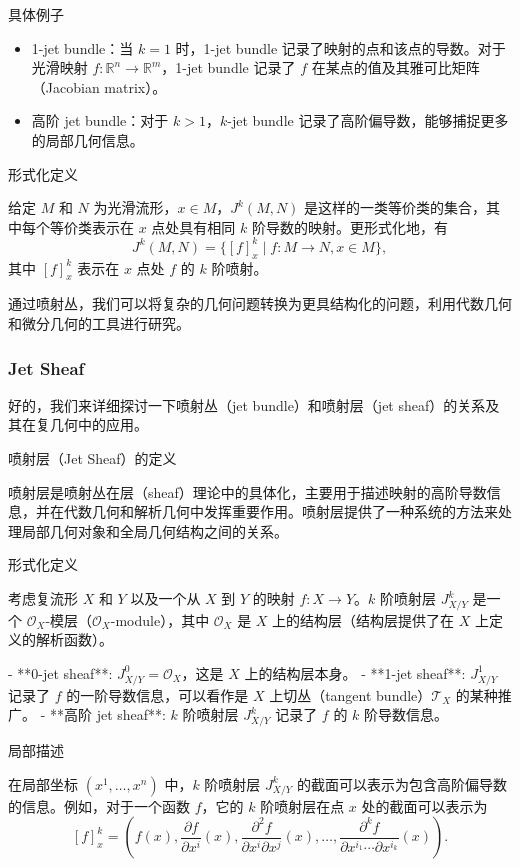 \documentclass[lang=cn,12pt,fontset=none,a4paper]{beautybook}
\begin{document}
具体例子
\begin{itemize}
   \item 1-jet bundle：当 $k=1$ 时，1-jet bundle 记录了映射的点和该点的导数。对于光滑映射 $f: \mathbb{R}^n \to \mathbb{R}^m$，1-jet bundle 记录了 $f$ 在某点的值及其雅可比矩阵（Jacobian matrix）。
   \item 高阶 jet bundle：对于 $k > 1$，$k$-jet bundle 记录了高阶偏导数，能够捕捉更多的局部几何信息。
\end{itemize}
   

形式化定义

给定 $M$ 和 $N$ 为光滑流形，$x \in M$，$J^k(M, N)$ 是这样的一类等价类的集合，其中每个等价类表示在 $x$ 点处具有相同 $k$ 阶导数的映射。更形式化地，有
$$ J^k(M, N) = \{ [f]_x^k \mid f: M \to N, x \in M \}, $$
其中 $[f]_x^k$ 表示在 $x$ 点处 $f$ 的 $k$ 阶喷射。

通过喷射丛，我们可以将复杂的几何问题转换为更具结构化的问题，利用代数几何和微分几何的工具进行研究。

\subsubsection*{Jet Sheaf}
好的，我们来详细探讨一下喷射丛（jet bundle）和喷射层（jet sheaf）的关系及其在复几何中的应用。

喷射层（Jet Sheaf）的定义

喷射层是喷射丛在层（sheaf）理论中的具体化，主要用于描述映射的高阶导数信息，并在代数几何和解析几何中发挥重要作用。喷射层提供了一种系统的方法来处理局部几何对象和全局几何结构之间的关系。

形式化定义

考虑复流形 $X$ 和 $Y$ 以及一个从 $X$ 到 $Y$ 的映射 $f: X \to Y$。$k$ 阶喷射层 $J^k_{X/Y}$ 是一个 $\mathcal{O}_X$-模层（$\mathcal{O}_X$-module），其中 $\mathcal{O}_X$ 是 $X$ 上的结构层（结构层提供了在 $X$ 上定义的解析函数）。

- **0-jet sheaf**: $J^0_{X/Y} = \mathcal{O}_X$，这是 $X$ 上的结构层本身。
- **1-jet sheaf**: $J^1_{X/Y}$ 记录了 $f$ 的一阶导数信息，可以看作是 $X$ 上切丛（tangent bundle）$\mathcal{T}_X$ 的某种推广。
- **高阶 jet sheaf**: $k$ 阶喷射层 $J^k_{X/Y}$ 记录了 $f$ 的 $k$ 阶导数信息。

局部描述

在局部坐标 $(x^1, \ldots, x^n)$ 中，$k$ 阶喷射层 $J^k_{X/Y}$ 的截面可以表示为包含高阶偏导数的信息。例如，对于一个函数 $f$，它的 $k$ 阶喷射层在点 $x$ 处的截面可以表示为
$$ [f]_x^k = \left( f(x), \frac{\partial f}{\partial x^i}(x), \frac{\partial^2 f}{\partial x^i \partial x^j}(x), \ldots, \frac{\partial^k f}{\partial x^{i_1} \cdots \partial x^{i_k}}(x) \right). $$
\end{document}

